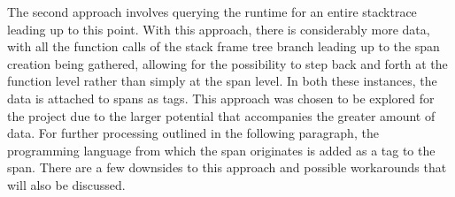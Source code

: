 \documentclass[12pt,pdftex,titlepage]{report}
\begin{document}
                The second approach involves querying the runtime for an entire stacktrace leading up to this point. With this approach, there is considerably more data, with all the function
                calls of the stack frame tree branch leading up to the span creation being gathered, allowing for the possibility to step back and forth at the function level rather than simply
                at the span level. In both these instances, the data is attached to spans as tags. This approach was chosen to be explored for the project due to the larger potential that accompanies
                the greater amount of data. For further processing outlined in the following paragraph, the programming language from which the span originates is added as a tag to the span.
                There are a few downsides to this approach and possible workarounds that will also be discussed.
                
\end{document}

